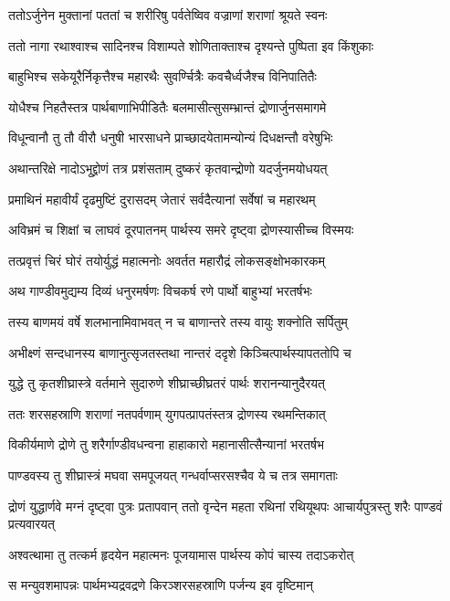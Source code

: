 \twolineshloka
{ततोऽर्जुनेन मुक्तानां पततां च शरीरिषु}
{पर्वतेष्विव वज्राणां शराणां श्रूयते स्वनः}


\twolineshloka
{ततो नागा रथाश्वाश्च सादिनश्च विशाम्पते}
{शोणिताक्ताश्च दृश्यन्ते पुष्पिता इव किंशुकाः}


\twolineshloka
{बाहुभिश्च सकेयूरैर्निकृत्तैश्च महारथैः}
{सुवर्ण्चित्रैः कवचैर्ध्वजैश्च विनिपातितैः}


\twolineshloka
{योधैश्च निहतैस्तत्र पार्थबाणाभिपीडितैः}
{बलमासीत्सुसम्भ्रान्तं द्रोणार्जुनसमागमे}


\twolineshloka
{विधून्वानौ तु तौ वीरौ धनुषी भारसाधने}
{प्राच्छादयेतामन्योन्यं दिधक्षन्तौ वरेषुभिः}


\twolineshloka
{अथान्तरिक्षे नादोऽभूद्द्रोणं तत्र प्रशंसताम्}
{दुष्करं कृतवान्द्रोणो यदर्जुनमयोधयत्}


\twolineshloka
{प्रमाथिनं महावीर्यं दृढमुष्टिं दुरासदम्}
{जेतारं सर्वदैत्यानां सर्वेषां च महारथम्}


\twolineshloka
{अविभ्रमं च शिक्षां च लाघवं दूरपातनम्}
{पार्थस्य समरे दृष्ट्वा द्रोणस्यासीच्च विस्मयः}


\twolineshloka
{तत्प्रवृत्तं चिरं घोरं तयोर्युद्धं महात्मनोः}
{अवर्तत महारौद्रं लोकसङ्क्षोभकारकम्}


\twolineshloka
{अथ गाण्डीवमुद्यम्य दिव्यं धनुरमर्षणः}
{विचकर्ष रणे पार्थो बाहुभ्यां भरतर्षभः}


\twolineshloka
{तस्य बाणमयं वर्षे शलभानामिवाभवत्}
{न च बाणान्तरे तस्य वायुः शक्नोति सर्पितुम्}


\twolineshloka
{अभीक्ष्णं सन्दधानस्य बाणानुत्सृजतस्तथा}
{नान्तरं ददृशे किञ्चित्पार्थस्यापततोपि च}


\twolineshloka
{युद्धे तु कृतशीघ्रास्त्रे वर्तमाने सुदारुणे}
{शीघ्राच्छीघ्रतरं पार्थः शरानन्यानुदैरयत्}


\twolineshloka
{ततः शरसहस्राणि शराणां नतपर्वणाम्}
{युगपत्प्रापतंस्तत्र द्रोणस्य रथमन्तिकात्}


\twolineshloka
{विकीर्यमाणे द्रोणे तु शरैर्गाण्डीवधन्वना}
{हाहाकारो महानासीत्सैन्यानां भरतर्षभ}


\twolineshloka
{पाण्डवस्य तु शीघ्रास्त्रं मघवा समपूजयत्}
{गन्धर्वाप्सरसश्चैव ये च तत्र समागताः}


\threelineshloka
{द्रोणं युद्धार्णवे मग्नं दृष्ट्वा पुत्रः प्रतापवान्}
{ततो वृन्देन महता रथिनां रथियूथपः}
{आचार्यपुत्रस्तु शरैः पाण्डवं प्रत्यवारयत्}


\twolineshloka
{अश्वत्थामा तु तत्कर्म हृदयेन महात्मनः}
{पूजयामास पार्थस्य कोपं चास्य तदाऽकरोत्}


\twolineshloka
{स मन्युवशमापन्नः पार्थमभ्यद्रवद्रणे}
{किरञ्शरसहस्राणि पर्जन्य इव वृष्टिमान्}


